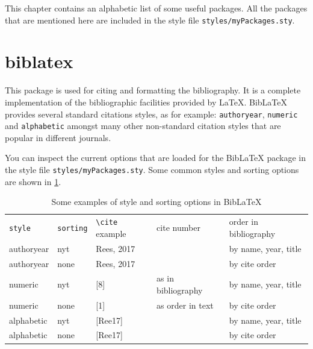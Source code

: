 \label{ch:usefulpackages}
This chapter contains an alphabetic list of some useful packages. All the packages that are mentioned here are included in the style file \verb|styles/myPackages.sty|.

\section{biblatex}\label{sec:biblatex}
This package is used for citing and formatting the bibliography. It is a complete implementation of the bibliographic facilities provided by \LaTeX. BibLaTeX provides several standard citations styles, as for example: \verb|authoryear|, \verb|numeric| and \verb|alphabetic| amongst many other non-standard citation styles that are popular in different journals.

You can inspect the current options that are loaded for the BibLaTeX package in the style file \verb|styles/myPackages.sty|. Some common styles and sorting options are shown in \cref{tab:biblatex}. 

\begin{table}\centering
    \caption{Some examples of style and sorting options in BibLaTeX}\label{tab:biblatex}
        \begin{tabular}{lllll}
        \toprule
        \verb|style|& \verb|sorting| & \verb|\cite| example  & cite number         & order in bibliography  \\[+1.5ex]
        authoryear  & nyt            & Rees, 2017 &                     & by name, year, title \\
        authoryear  & none           & Rees, 2017 &                     & by cite order \\
        numeric     & nyt            & [8]        &  as in bibliography & by name, year, title \\
        numeric     & none           & [1]        &  as order in text   & by cite order  \\
        alphabetic  & nyt            & [Ree17]    &                     & by name, year, title \\
        alphabetic  & none           & [Ree17]    &                     & by cite order  \\
        \bottomrule
        \end{tabular}
\end{table}

